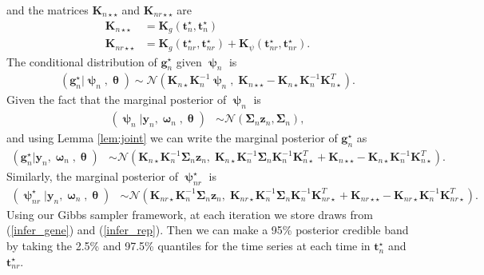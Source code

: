\documentclass[11pt]{article}
\newcommand{\pN}{\mathcal{N}}
\newcommand{\1}{\mathbf{1}}
\newcommand{\0}{\mathbf{0}}
\newcommand{\K}{\mathbf{K}}
\newcommand{\y}{\mathbf{y}}
\begin{document}
%
%
and the matrices $\K_{n\star\star}$ and $\K_{nr\star\star}$ are
%
%
\begin{align*}
	\K_{n\star\star} &= \K_g(\mathbf{t}_{n}^\star, \mathbf{t}_{n}^\star) \\
	\K_{nr\star\star} &= \K_g(\mathbf{t}_{nr}^\star, \mathbf{t}_{nr}^\star) + \K_\psi(\mathbf{t}_{nr}^\star, \mathbf{t}_{nr}^\star). 
\end{align*}
%
%
%
The conditional distribution of $\mathbf{g}_n^\star$ given $\bm{\uppsi}_{n}$ is 
%
%
\begin{align*}
	(\mathbf{g}_{n}^\star | \bm{\uppsi}_{n} , \bm{\uptheta}) \sim \pN\left( \K_{n\star}\K_n^{-1}\bm{\uppsi}_{n},\; \K_{n\star\star} - \K_{n\star}\K_n^{-1}\K_{n\star}^T \right).
\end{align*}
%
%
%
Given the fact that the marginal posterior of $\bm{\uppsi}_{n}$ is
%
%
\begin{align*}
	(\bm{\uppsi}_{n} | \y_{n}, \bm{\upomega}_{n}, \bm{\uptheta})  &\sim \pN \left(\bm{\Sigma}_{n} \mathbf{z}_n, \bm{\Sigma}_{n}  \right),
\end{align*}
%
%
and using Lemma \ref{lem:joint} we can write the marginal posterior of $\mathbf{g}_n^\star$ as 
%
%
\begin{align}
	(\mathbf{g}_n^\star | \y_{n}, \bm{\upomega}_{n}, \bm{\uptheta}) &\sim \pN \left( \K_{n\star}\K_n^{-1}\bm{\Sigma}_{n} \mathbf{z}_n,\; \K_{n\star}\K_n^{-1}\bm{\Sigma}_{n}\K_n^{-1} \K_{n\star}^T + \K_{n\star\star} - \K_{n\star}\K_n^{-1}\K_{n\star}^T \right). \label{infer_gene}
\end{align}
%
%
Similarly, the marginal posterior of $\bm{\uppsi}_{nr}^{\star}$ is 
%
%
\begin{align}
	(\bm{\uppsi}_{nr}^{\star} | \y_{n}, \bm{\upomega}_{n}, \bm{\uptheta}) &\sim \pN \left( \K_{nr\star}\K_n^{-1}\bm{\Sigma}_{n} \mathbf{z}_n,\; \K_{nr\star}\K_n^{-1}\bm{\Sigma}_{n}\K_n^{-1} \K_{nr\star}^T + \K_{nr\star\star} - \K_{nr\star}\K_n^{-1}\K_{nr\star}^T \right). \label{infer_rep}
\end{align}
%
%
%
Using our Gibbs sampler framework, at each iteration we store draws from (\ref{infer_gene}) and (\ref{infer_rep}). Then we can make a 95\% posterior credible band by taking the 2.5\% and 97.5\% quantiles for the time series at each time in $\mathbf{t}_{n}^\star$ and $\mathbf{t}_{nr}^\star$.
%
%
%
\end{document}
